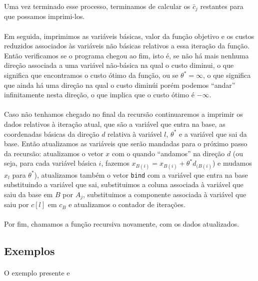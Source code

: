 \documentclass[a4paper]{article}
\begin{document}
Uma vez terminado esse processo, terminamos de calcular os $\bar{c}_{j}$ restantes para que possamos imprimi-los.\paragraph{}
Em seguida, imprimimos as variáveis básicas, valor da função objetivo e os custos reduzidos associados às variáveis não básicas relativos a essa iteração da função. Então verificamos se o programa chegou ao fim, isto é, se não há mais nenhuma direção associada a uma variável não-básica na qual o custo diminui, o que significa que encontramos o custo ótimo da função, ou se $\theta^* = \infty$, o que significa que ainda há uma direção na qual o custo diminúi porém podemos ``andar'' infinitamente nesta direção, o que implica que o custo ótimo é $-\infty$.\paragraph{}
Caso não tenhamos chegado no final da recursão continuaremos a imprimir os dados relativos à iteração atual, que são a variável que entra na base, as coordenadas básicas da direção $d$ relativa à variável $l$, $\theta^*$ e a variável que sai da base. Então atualizamos as variáveis que serão mandadas para o próximo passo da recursão: atualizamos o vetor $x$ com o quando ``andamos'' na direção $d$ (ou seja, para cada variável básica $i$, fazemos $x_{B(i)} = x_{B(i)} +\theta^*d_{(B(i)}$) e mudamos $x_{l}$ para $\theta^*$), atualizamos também o vetor \texttt{bind} com a variável que entra na base substituindo a variável que sai, substituimos a coluna associada à variável que saiu da base em $B$ por $A_{j}$, substituimos a componente associada à variável que saiu por $c[l]$ em $c_{B}$ e atualizamos o contador de iterações.\paragraph{}
Por fim, chamamos a função recursiva novamente, com os dados atualizados.

\subsection{Exemplos}

\paragraph{}
O exemplo presente e
\end{document}
